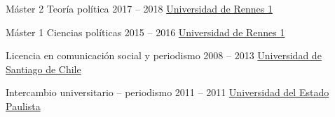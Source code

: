 \begin{yearlist}

\item[Máster 2 Teoría política ]{2017 -- 2018}
     {\href{https://formations.univ-rennes1.fr/formations/master-2-theorie-politique}{Universidad de Rennes 1}}
		 {}
     

\item[Máster 1 Ciencias políticas ]{2015 -- 2016}
     {\href{https://formations.univ-rennes1.fr/formations/master-1-science-politique}{Universidad de Rennes 1}}
		 {}


\item[Licencia en comunicación social y periodismo ]{2008 -- 2013}
     {\href{http://periodismo.usach.cl/} {Universidad de Santiago de Chile}}
		 {}


\item[Intercambio universitario -- periodismo ]{2011 -- 2011}
     {\href{http://www.unesp.br/} {Universidad del Estado \\ Paulista}}
		 {}


\end{yearlist}





%
%



